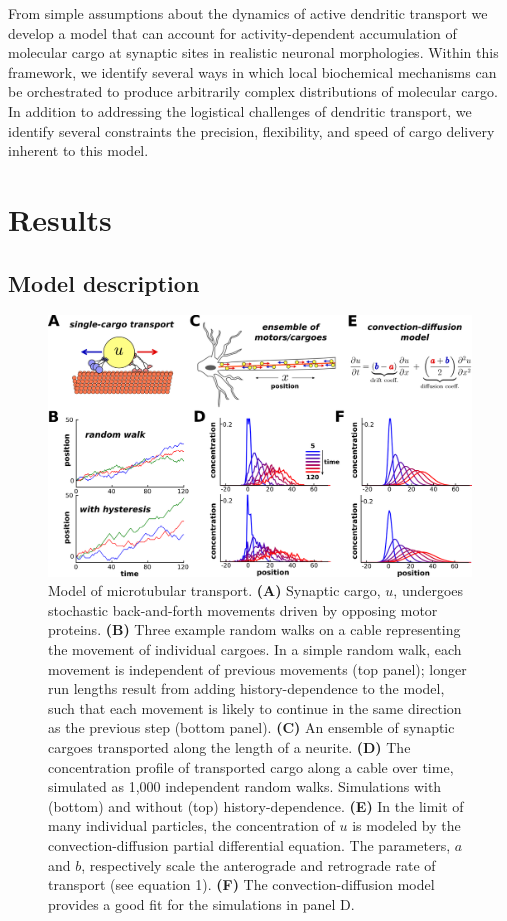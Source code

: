 \documentclass[10pt]{wlpeerj}
\begin{document}
From simple assumptions about the dynamics of active dendritic transport we develop a model that can account for activity-dependent accumulation of molecular cargo at synaptic sites in realistic neuronal morphologies.
Within this framework, we identify several ways in which local biochemical mechanisms can be orchestrated to produce arbitrarily complex distributions of molecular cargo.
In addition to addressing the logistical challenges of dendritic transport, we identify several constraints the precision, flexibility, and speed of cargo delivery inherent to this model.

\hl{}

\section*{Results}

\subsection*{Model description}

\begin{figure}[!tb]
\begin{center}
\includegraphics[width=0.9\columnwidth]{00_stochastic.png}
\caption{Model of microtubular transport.
\textbf{(A)} Synaptic cargo, $u$, undergoes stochastic back-and-forth movements driven by opposing motor proteins.
\textbf{(B)} Three example random walks on a cable representing the movement of individual cargoes. In a simple random walk, each movement is independent of previous movements (top panel); longer run lengths result from adding history-dependence to the model, such that each movement is likely to continue in the same direction as the previous step (bottom panel).
\textbf{(C)} An ensemble of synaptic cargoes transported along the length of a neurite.
\textbf{(D)} The concentration profile of transported cargo along a cable over time, simulated as 1,000 independent random walks. Simulations with (bottom) and without (top) history-dependence.
\textbf{(E)} In the limit of many individual particles, the concentration of $u$ is modeled by the convection-diffusion partial differential equation. The parameters, $a$ and $b$, respectively scale the anterograde and retrograde rate of transport (see equation 1).
\textbf{(F)} The convection-diffusion model provides a good fit for the simulations in panel D.
}
\end{center}
\end{figure}
\end{document}
